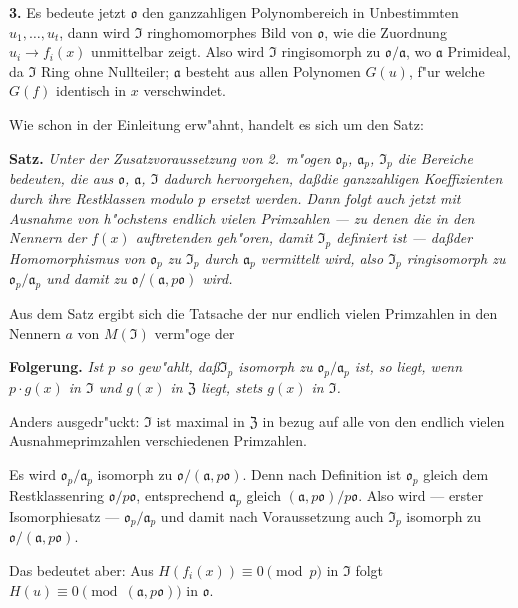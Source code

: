 \documentclass[12pt,a4paper]{article}
\theoremstyle{plain}
\begin{document}
\medskip\noindent\textbf{3.}
Es bedeute jetzt $\mathfrak{o}$ den ganzzahligen Polynombereich in Unbestimmten $u_1,\ldots,u_t$, dann wird $\mathfrak{I}$ ringhomomorphes Bild von $\mathfrak{o}$, wie die Zuordnung $u_i \to f_i(x)$ unmittelbar zeigt. Also wird $\mathfrak{I}$ ringisomorph zu $\mathfrak{o}/\mathfrak{a}$, wo $\mathfrak{a}$ Primideal, da $\mathfrak{I}$ Ring ohne Nullteiler; $\mathfrak{a}$ besteht aus allen Polynomen $G(u)$, f"ur welche $G(f)$ identisch in $x$ verschwindet.

Wie schon in der Einleitung erw"ahnt, handelt es sich um den Satz:

\medskip\noindent\textbf{Satz.}
\textit{Unter der Zusatzvoraussetzung von 2.\ m"ogen $\mathfrak{o}_p$, $\mathfrak{a}_p$, $\mathfrak{I}_p$ die Bereiche bedeuten, die aus $\mathfrak{o}$, $\mathfrak{a}$, $\mathfrak{I}$ dadurch hervorgehen, da\ss die ganzzahligen Koeffizienten durch ihre Restklassen modulo $p$ ersetzt werden. Dann folgt auch jetzt mit Ausnahme von h"ochstens endlich vielen Primzahlen --- zu denen die in den Nennern der $f(x)$ auftretenden geh"oren, damit $\mathfrak{I}_p$ definiert ist --- da\ss der Homomorphismus von $\mathfrak{o}_p$ zu $\mathfrak{I}_p$ durch $\mathfrak{a}_p$ vermittelt wird, also $\mathfrak{I}_p$ ringisomorph zu $\mathfrak{o}_p/\mathfrak{a}_p$ und damit zu $\mathfrak{o}/(\mathfrak{a}, p\mathfrak{o})$ wird.}

Aus dem Satz ergibt sich die Tatsache der nur endlich vielen Primzahlen in den Nennern $a$ von $M(\mathfrak{I})$ verm"oge der

\medskip\noindent\textbf{Folgerung.}
\textit{Ist $p$ so gew"ahlt, da\ss $\mathfrak{I}_p$ isomorph zu $\mathfrak{o}_p/\mathfrak{a}_p$ ist, so liegt, wenn $p \cdot g(x)$ in $\mathfrak{I}$ und $g(x)$ in $\mathfrak{Z}$ liegt, stets $g(x)$ in $\mathfrak{I}$.}

Anders ausgedr"uckt: $\mathfrak{I}$ ist maximal in $\mathfrak{Z}$ in bezug auf alle von den endlich vielen Ausnahmeprimzahlen verschiedenen Primzahlen.

Es wird $\mathfrak{o}_p/\mathfrak{a}_p$ isomorph zu $\mathfrak{o}/(\mathfrak{a}, p\mathfrak{o})$. Denn nach Definition ist $\mathfrak{o}_p$ gleich dem Restklassenring $\mathfrak{o}/p\mathfrak{o}$, entsprechend $\mathfrak{a}_p$ gleich $(\mathfrak{a}, p\mathfrak{o})/p\mathfrak{o}$. Also wird --- erster Isomorphiesatz --- $\mathfrak{o}_p/\mathfrak{a}_p$ und damit nach Voraussetzung auch $\mathfrak{I}_p$ isomorph zu $\mathfrak{o}/(\mathfrak{a}, p\mathfrak{o})$.

Das bedeutet aber: Aus $H(f_i(x)) \equiv 0 \pmod{p}$ in $\mathfrak{I}$ folgt $H(u) \equiv 0 \pmod{(\mathfrak{a}, p\mathfrak{o})}$ in $\mathfrak{o}$.
\end{document}
